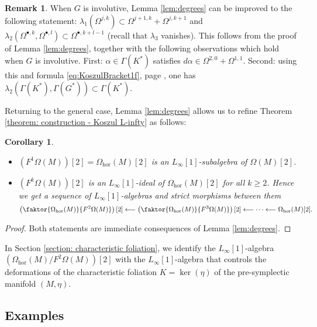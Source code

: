 \documentclass[11pt,thmsa]{amsart}
\newtheorem{corollary}[theorem]{Corollary}
\theoremstyle{definition}
\newtheorem{remark}[theorem]{Remark}
\newcommand{\hor}{\mathrm{hor}}
\newcommand{\lione}{$L_{\infty}[1]$-algebra }
\newcommand{\liones}{$L_{\infty}[1]$-algebras }
\begin{document}
{ 
\begin{remark}
When $G$ is involutive, Lemma \ref{lem:degrees}  can be improved to the following statement:
$\lambda_1(\Omega^{j,k})\subset \Omega^{j+1,k}+\Omega^{j,k+1}$ and 
$\lambda_2(\Omega^{\bullet,k}, \Omega^{\bullet,l})\subset  \Omega^{\bullet,k+l-1}$ (recall that $\lambda_3$ vanishes).
This follows from the proof of Lemma \ref{lem:degrees}, together with the following observations which hold when $G$ is involutive.
First:  $\alpha\in \Gamma(K^*)$ satisfies $d\alpha\in \Omega^{2,0}+\Omega^{1,1}$. Second: using this and formula \eqref{eq:KoszulBracket1f}, page \pageref{eq:KoszulBracket1f}, one has
   $\lambda_2(\Gamma(K^*),\Gamma(G^*)) \subset \Gamma(K^*)$.
\end{remark}
Returning to the general case, Lemma \ref{lem:degrees} allows us to
refine Theorem \ref{theorem: construction - Koszul L-infty}
as follows:
\begin{corollary}\label{cor:liideal}
\hspace{0cm}
\begin{itemize}
\item [1)] $(F^{1}\Omega(M))[2]=\Omega_\hor(M)[2]$ is an $L_{\infty}[1]$-subalgebra of $\Omega(M)[2]$.
\item [2)] $(F^{k}\Omega(M))[2]$ is an $L_{\infty}[1]$-ideal of $\Omega_\hor(M)[2]$ for all $k\ge 2$. Hence we get a sequence of \liones and strict morphisms between them
$$ \left(\faktor{\Omega_{\hor}(M)}{F^2\Omega(M)}\right)[2] \longleftarrow \left(\faktor{\Omega_{\hor}(M)}{F^3\Omega(M)}\right)[2] \longleftarrow \cdots \longleftarrow \Omega_{\hor}(M)[2].$$
\end{itemize}
\end{corollary}
\begin{proof}
Both statements are immediate consequences of Lemma \ref{lem:degrees}.
\end{proof}


In Section \ref{section: characteristic foliation}, we identify the \lione $(\Omega_\hor(M)/F^2\Omega(M))[2]$ with the \lione that controls the deformations of the characteristic foliation $K=\ker(\eta)$ of the pre-symplectic manifold $(M,\eta)$.
\\





 


\subsection{Examples}\label{section: examples}

}
\end{document}
